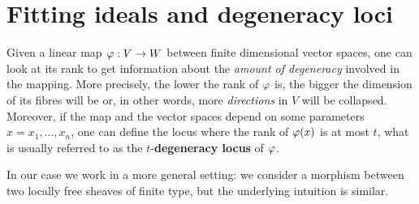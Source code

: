 \section{Fitting ideals and degeneracy loci}\label{sec:fitt_deg}
	
	Given a linear map $\varphi:V\to W$ between finite dimensional vector spaces, one can look at its rank to get information about the \emph{amount of degeneracy} involved in the mapping. 
	More precisely, the lower the rank of $\varphi$ is, the bigger the dimension of its fibres will be or, in other words, more \emph{directions} in $V$ will be collapsed. 
	Moreover, if the map and the vector spaces depend on some parameters $x = x_1,\dots, x_n$, one can define the locus where the rank of $\varphi(x)$ is at most $t$, what is usually referred to as the $t$-\textbf{degeneracy locus} of $\varphi$.\\

	In our case we work in a more general setting: we consider a morphism between two locally free sheaves of finite type, but the underlying intuition is similar.\\

